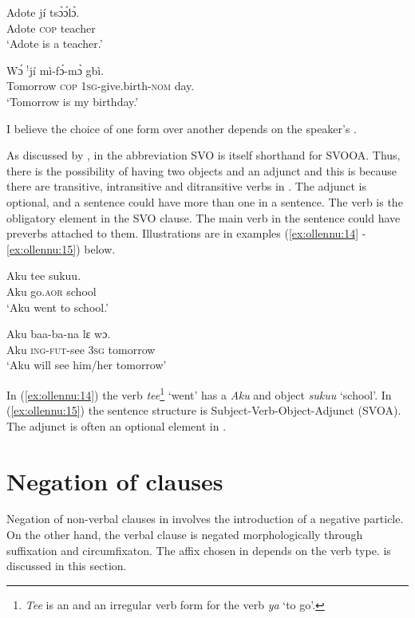 \documentclass[output=paper,newtxmath,modfonts,nonflat,hidelinks]{langsci/langscibook}
\begin{document}
\ea \label{ex:ollennu:12}
\gll Adote jí ts\`ɔ\'ɔl\`ɔ.\\
Adote \textsc{cop} teacher\\
\glt`Adote is a teacher.'
\z

\ea \label{ex:ollennu:13}
\gll W\'ɔ $^{!}$jí mì-f\'ɔ-m\`ɔ gbì.\\
Tomorrow \textsc{cop} 1\textsc{sg}-give.birth-\textsc{nom} day.\\
\glt `Tomorrow is my birthday.'
\z


I believe the choice of one form over another depends on the speaker’s .

As discussed by \citet{Dakubu2003}, in  the abbreviation SVO is itself shorthand for SVOOA. Thus, there is the possibility of having two objects and an adjunct and this is because there are transitive, intransitive and ditransitive verbs in . The adjunct is optional, and a sentence could have more than one in a sentence. The verb is the obligatory element in the SVO clause. The main verb in the sentence could have preverbs attached to them. Illustrations are in examples (\ref{ex:ollennu:14} -\ref{ex:ollennu:15}) below.

\ea \label{ex:ollennu:14}
\gll Aku tee sukuu.\\
Aku go.\textsc{aor} school\\
\glt `Aku went to school.'
\z

\ea \label{ex:ollennu:15}
 \gll Aku baa-ba-na lɛ wɔ.\\
Aku \textsc{ing}-\textsc{fut}-see 3\textsc{sg} tomorrow\\
\glt`Aku will see him/her tomorrow'
\z


In (\ref{ex:ollennu:14}) the verb \textit{tee}\footnote{\textit{Tee} is an  and an irregular verb form for the verb \textit{ya} `to go'.} `went' has a  \textit{Aku} and object \textit{sukuu} `school'. In (\ref{ex:ollennu:15}) the sentence structure is Subject-Verb-Object-Adjunct (SVOA). The adjunct is often an optional element in .

\section{\label{sec:ollennu:2} Negation of clauses}


Negation of non-verbal clauses in  involves the introduction of a {negative particle}. On the other hand, the verbal clause is negated morphologically through suffixation and circumfixaton. The affix chosen in  depends on the verb type.   is discussed in this section.
\end{document}
